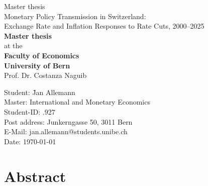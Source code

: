 \documentclass[12pt,a4paper]{article}
\renewcommand{\baselinestretch}{1.5}
\begin{document}
\thispagestyle{empty}
\vspace{1.0cm}
\begin{center}
	{\LARGE{Master thesis}}\\[0.6cm]
	{\Large{Monetary Policy Transmission in Switzerland: \\
			Exchange Rate and Inflation Responses to Rate Cuts, 2000--2025}}\\[1.5cm]
	{\bf Master thesis}\\
	at the\\[0.5cm]
	{\bf Faculty of Economics}\\
	{\bf University of Bern}\\[0.5cm]
	Prof. Dr. Costanza Naguib\\[2.5cm]
	
	\hspace{1cm}\begin{minipage}[h]{12cm}
		\begin{tabbing}
			Student: \hspace{1cm} \= Jan Allemann \\[0.15cm]
			Master: \> International and Monetary Economics \\[0.15cm]
			Student-ID: .927 \\[0.15cm]
			Post address: \> Junkerngasse 50, 3011 Bern \\[0.15cm]
			E-Mail: \> jan.allemann@students.unibe.ch \\[0.15cm]
			Date: \> \today
		\end{tabbing}
	\end{minipage}
\end{center}
\newpage

\begingroup
\footnotesize
\renewcommand{\baselinestretch}{0.85}
\setcounter{tocdepth}{2}  %

\newpage
\thispagestyle{empty}

\section*{Abstract}
\end{document}
